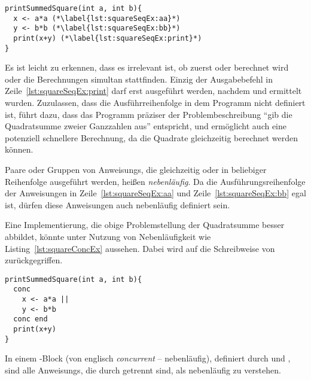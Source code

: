 \begin{lstlisting}[caption={[Beispiel eines \glsentryuseri{Programm}, das sequentiell die Summe von Quadraten zweier Ganzzahlen berechnet.]Beispiel eines \glsuseri{Programm} das die Summe von Quadraten zweier Ganzzahlen berechnet. Die Berechnung der Quadratzahlen wird nacheinander in einer fest definierten Sequenz durchgeführt.}, label={lst:squareSeqEx},float={!htbp}]
printSummedSquare(int a, int b){
  x <- a*a (*\label{lst:squareSeqEx:aa}*)
  y <- b*b (*\label{lst:squareSeqEx:bb}*)
  print(x+y) (*\label{lst:squareSeqEx:print}*)
}
\end{lstlisting}
Es ist leicht zu erkennen, dass es irrelevant ist, ob zuerst  oder  berechnet wird oder die Berechnungen simultan stattfinden. Einzig der Ausgabebefehl in Zeile~\ref{lst:squareSeqEx:print} darf erst ausgeführt werden, nachdem  und  ermittelt wurden. Zuzulassen, dass die Ausführreihenfolge in dem \gls{Programm} nicht definiert ist, führt dazu, dass das \gls{Programm} präziser der Problembeschreibung \enquote{gib die Quadratsumme zweier Ganzzahlen aus} entspricht, und ermöglicht auch eine potenziell schnellere Berechnung, da die Quadrate gleichzeitig berechnet werden können.

Paare oder Gruppen von \glspl{Anweisung}, die gleichzeitig oder in beliebiger Reihenfolge ausgeführt werden, heißen \emph{nebenläufig}. Da die Ausführungsreihenfolge der Anweisungen in Zeile~\ref{lst:squareSeqEx:aa} und Zeile~\ref{lst:squareSeqEx:bb} egal ist, dürfen diese Anweisungen auch nebenläufig definiert sein.

Eine Implementierung, die obige Problemstellung der Quadratsumme besser abbildet, könnte unter Nutzung von Nebenläufigkeit wie Listing~\ref{lst:squareConcEx} aussehen. Dabei wird auf die Schreibweise von \textcite[S.~16]{Herrtwich1989} zurückgegriffen.
\begin{lstlisting}[caption={[Beispiel eines \glsentryuseri{Programm} mit nebenläufigem Code in einem \code{conc}-Block.]Beispiel eines \glsuseri{Programm} mit nebenläufigem Code in einem \code{conc}-Block. Das \gls{Programm} gibt die Summe von zwei Quadratzahlen aus, wobei die Berechnung der Quadratzahlen nebenläufig stattfindet.}, label={lst:squareConcEx},float={!htbp}]
printSummedSquare(int a, int b){
  conc 
    x <- a*a ||
    y <- b*b
  conc end
  print(x+y)
}
\end{lstlisting}
In einem -Block (von englisch \emph{concurrent} -- nebenläufig), definiert durch  und , sind alle \glspl{Anweisung}, die durch \code{||} getrennt sind, als nebenläufig zu verstehen. 

